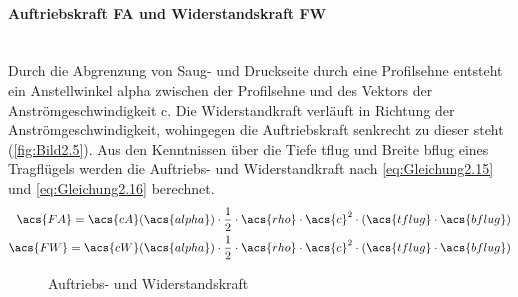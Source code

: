 \paragraph{Auftriebskraft \acs{FA} und Widerstandskraft \acs{FW}}\mbox{}\smallskip\\
Durch die Abgrenzung von Saug- und Druckseite durch eine Profilsehne entsteht ein Anstellwinkel \acs{alpha} zwischen der Profilsehne und des Vektors der Anströmgeschwindigkeit \acs{c}. Die Widerstandkraft verläuft in Richtung der Anströmgeschwindigkeit, wohingegen die Auftriebskraft senkrecht zu dieser steht (\autoref{fig:Bild2.5}). Aus den Kenntnissen über die Tiefe \acs{tflug} und Breite \acs{bflug} eines Tragflügels werden die Auftriebs- und Widerstandkraft nach \autoref{eq:Gleichung2.15} und \autoref{eq:Gleichung2.16} berechnet.
\begin{align}
    \acs{FA} = \acs{cA}(\acs{alpha}) \cdot \frac{1}{2} \cdot \acs{rho} \cdot \acs{c}^2 \cdot (\acs{tflug} \cdot \acs{bflug}) \label{eq:Gleichung2.15} \\
    \acs{FW} = \acs{cW}(\acs{alpha}) \cdot \frac{1}{2} \cdot \acs{rho} \cdot \acs{c}^2 \cdot (\acs{tflug} \cdot \acs{bflug}) \label{eq:Gleichung2.16}
\end{align}
\begin{figure}[H]
   \centering
   \caption[Auftriebs- und Widerstandskraft]{Auftriebs- und Widerstandskraft \cite{SkriptSchulte}}
   \label{fig:Bild2.5}
\end{figure}

